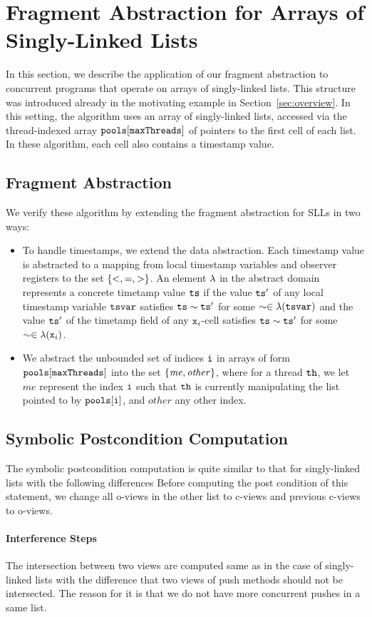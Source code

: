 \section{Fragment Abstraction for Arrays of Singly-Linked Lists}
In this section, we describe the application of our fragment abstraction to concurrent programs that operate on arrays of singly-linked lists. This structure
was introduced already in the motivating example in
Section~\ref{sec:overview}.
In this setting, the algorithm uses an array of singly-linked lists, accessed via the thread-indexed array ${\tt pools[maxThreads]}$ of pointers to the first cell of each list. In these algorithm, each cell also contains a timestamp value.

\subsection{Fragment Abstraction}
We verify these algorithm by extending the fragment abstraction for SLLs in
two ways:
\begin{itemize}
\item   To handle timestamps, we extend the data abstraction. Each timestamp value is abstracted to a mapping from local timestamp variables and observer
  registers to the set $\left\{<,=,>\right\}$.
  An element $\lambda$ in the abstract domain represents a concrete timetamp value $\tt ts$ if the value $\tt ts'$ of any local timestamp variable
  $\mathtt{tsvar}$ satisfies $\tt ts \sim ts'$ for some $\sim \in
  \lambda(\mathtt{tsvar})$ and the value $\tt ts'$ of the timetamp field
  of any $\mathtt{x}_i$-cell satisfies $\tt ts \sim ts'$ for some $\sim \in
  \lambda(\mathtt{x}_i)$.
\item
  We abstract the unbounded set of indices $\tt i$ in arrays of form
  $\tt pools[maxThreads]$ into the set $\left\{\mathit{me},\mathit{other}\right\}$, where
  for a thread ${\tt th}$, we let $\mathit{me}$ represent the index
  $\tt i$ such that ${\tt th}$ is currently manipulating the list pointed to
  by $\tt pools[i]$, and $\mathit{other}$ any other index.
\end{itemize}

\subsection{Symbolic Postcondition Computation}
The symbolic postcondition computation is quite similar to that for singly-linked lists with the following differences
Before computing the post condition of this statement, we change all o-views in the other list to c-views and previous c-views to o-views.  

\paragraph{Interference Steps} 
The intersection between two views are computed same as in the case of singly-linked lists with the difference that two views of push methods should not be intersected. The reason for it is that we do not have more concurrent pushes in a same list.








